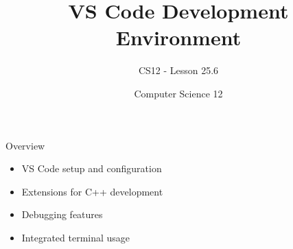 \documentclass[10pt]{beamer}
\title{VS Code Development Environment}
\subtitle{CS12 - Lesson 25.6}
\author{Computer Science 12}
\date{}
\begin{document}
\begin{frame}
    \titlepage
\end{frame}

\begin{frame}{Overview}
    \begin{itemize}
        \item VS Code setup and configuration
        \item Extensions for C++ development
        \item Debugging features
        \item Integrated terminal usage
    \end{itemize}
\end{frame}

\end{document}
